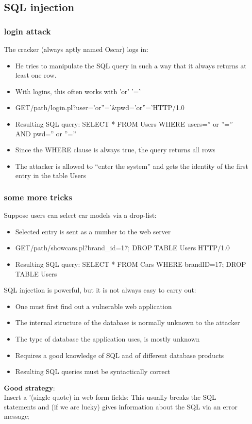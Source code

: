 \documentclass[10pt]{article}
\begin{document}
\subsection{SQL injection}
\subsubsection{login attack}
The cracker (always aptly named Oscar) logs in:
\begin{itemize}
	\item He tries to manipulate the SQL query in such a way that it always returns at least one row.
	\item With logins, this often works with 'or' '='
	\item GET/path/login.pl?user='or''='\&pwd='or''='HTTP/1.0
	\item Resulting SQL query: SELECT * FROM Users WHERE users='' or ''='' AND pwd='' or ''=''
	\item Since the WHERE clause is always true, the query returns all rows
	\item The attacker is allowed to “enter the system” and gets the identity of the first entry in the table Users
\end{itemize}
\subsubsection{some more tricks}
Suppose users can select car models via a drop-list:
\begin{itemize}
	\item Selected entry is sent as a number to the web server
	\item GET/path/showcars.pl?brand\_id=17; DROP TABLE Users HTTP/1.0
	\item Resulting SQL query: SELECT * FROM Cars WHERE brandID=17; DROP TABLE Users
\end{itemize}
SQL injection is powerful, but it is not always easy to carry out:
\begin{itemize}
	\item One must first find out a vulnerable web application
	\item The internal structure of the database is normally unknown to the attacker
	\item The type of database the application uses, is mostly unknown
	\item Requires a good knowledge of SQL and of different database products
	\item Resulting SQL queries must be syntactically correct
\end{itemize}
\textbf{Good strategy}: \\
Insert a '(single quote) in web form fields: This usually breaks the SQL statements and (if we are lucky) gives information about the SQL via an error message;
\end{document}
